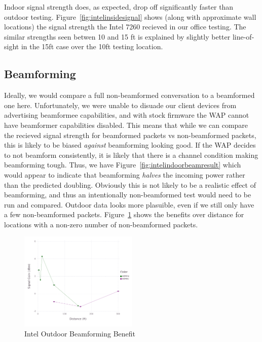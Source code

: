 Indoor signal strength does, as expected, drop off significantly
faster than outdoor testing. Figure~\ref{fig:intelinsidesignal} shows
(along with approximate wall locations) the signal strength the Intel
7260 recieved in our office testing. The similar strengths seen betwen
10 and 15 ft is explained by slightly better line-of-sight in the 15ft
case over the 10ft testing location. 




\subsection{Beamforming}


Ideally, we would compare a full non-beamformed conversation to a
beamformed one here. Unfortunately, we were unable to disuade our
client devices from advertising beamformee capabilities, and with
stock firmware the WAP cannot have beamformer capabilities disabled.
This means that while we can compare the recieved signal strength for
beamformed packets vs non-beamformed packets, this is likely to be
biased \emph{against} beamforming looking good. If the WAP decides to
not beamform consistently, it is likely that there is a channel
condition making beamforming tough.   Thus, we have Figure~\ref{fig:intelindoorbeamresult}
which would appear to indicate that beamforming \emph{halves} the
incoming power rather than the predicted doubling. Obviously this is
not likely to be a realistic effect of beamforming, and thus an
intentionally non-beamformed test would need to be run and
compared. Outdoor data looks more plasuible, even if we still only
have a few non-beamformed
packets. Figure~\ref{fig:inteloutdoorbeambenefit} shows the benefits
over distance for locations with a non-zero number of non-beamformed
packets.
\begin{figure}[!h]
\centering
\includegraphics[width=0.5\textwidth]{figures/Intel_Outside_Beamforming_Benefit}
\caption{Intel Outdoor Beamforming Benefit}
\label{fig:inteloutdoorbeambenefit}
\end{figure}

